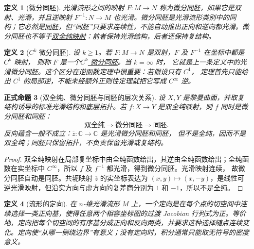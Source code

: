 \documentclass[UTF8,fontset=none,a4paper,11pt]{ctexart}
\theoremstyle{foundation-definition}
\newtheorem{definition}{定义}[section]
\theoremstyle{foundation-theorem}
\theoremstyle{foundation-proposition}
\newtheorem{proposition}[definition]{正式命题}
\theoremstyle{foundation-example}
\theoremstyle{foundation-remark}
\theoremstyle{foundation-theorem}
\newcommand{\term}[2]{\hyperref[#1]{#2}}
\begin{document}
\begin{definition}[微分同胚]\label{def:diffeomorphism}
光滑流形之间的映射 \(F:M\to N\) 称为\term{def:diffeomorphism}{微分同胚}，如果它是双射、光滑，并且逆映射 \(F^{-1}:N\to M\) 也光滑。微分同胚是光滑流形类别中的同构；它必然是\term{def:homeomorphism}{同胚}，但“同胚”只要求连续性，不能自动推出正向和逆向都光滑。微分同胚也不等于\term{def:biholomorphic}{双全纯映射}：前者保持光滑结构，后者还保持复结构。
\end{definition}

\begin{definition}[\(C^k\) 微分同胚]\label{def:ck-diffeomorphism}
设 \(k\geq1\)。若 \(F:M\to N\) 是双射，\(F\) 及 \(F^{-1}\) 在坐标中都是 \(C^k\) 映射，
则称 \(F\) 是一个\term{def:ck-diffeomorphism}{\(C^k\) 微分同胚}。当 \(k=\infty\) 时，
它就是上一条定义中的光滑微分同胚。这个区分在逆函数定理中很重要：若假设只有 \(C^1\)，
定理首先只能给出 \(C^1\) 的局部逆，不能未经额外正则性定理就把它写成 \(C^\infty\) 逆。
\end{definition}

\begin{proposition}[双全纯、微分同胚与同胚的层次关系]\label{prop:biholo-diffeo-homeo}
设 \(X,Y\) 是黎曼曲面，并取复结构诱导的标准光滑结构和底层拓扑。若
\(f:X\to Y\) 是双全纯映射，则 \(f\) 同时是微分同胚和同胚：
\[
\text{双全纯}\Longrightarrow\text{微分同胚}\Longrightarrow\text{同胚}.
\]
反向蕴含一般不成立：\(\overline z:\mathbb C\to\mathbb C\) 是光滑微分同胚和同胚，
但不是全纯，因而不是双全纯；同胚只保留拓扑，不负责保留光滑或复结构。
\end{proposition}

\begin{proof}
双全纯映射在局部复坐标中由全纯函数给出，其逆由全纯函数给出；全纯函数在实坐标中
\(C^\infty\)，所以 \(f\) 及 \(f^{-1}\) 都光滑，得到微分同胚。光滑映射连续，
故微分同胚自动是同胚。共轭映射 \(\overline z\) 的实坐标表达为
\((x,y)\mapsto(x,-y)\)，是线性可逆光滑映射，但沿实方向与虚方向的复差商分别为
\(1\) 和 \(-1\)，所以不是全纯。\end{proof}

\begin{definition}[流形的定向]\label{def:manifold-orientation}
在 \(n\)-维光滑流形 \(M\) 上，一个\term{def:manifold-orientation}{定向}是在每个点的切空间中连续选择一类正向基，使得任意两个相容坐标图的过渡 Jacobian 行列式为正。等价地，定向把每个切空间的有序基分成正向和反向两类，并要求这种选择随点连续变化。定向使“从哪一侧绕边界”有意义；没有定向时，积分通常只能取无符号的密度意义。
\end{definition}
\end{document}

